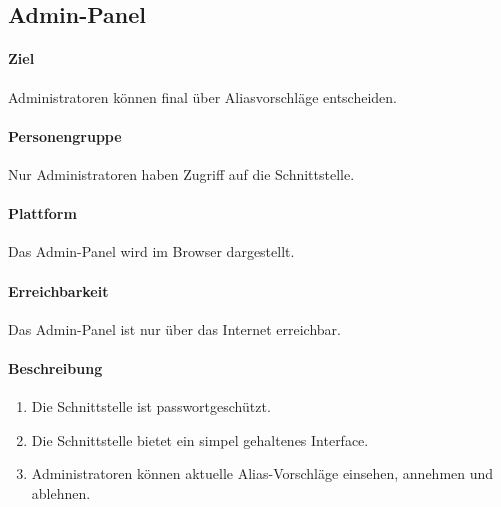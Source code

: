 \subsection{Admin-Panel}
\label{Admin-Panel}
\paragraph{Ziel}
Administratoren können final über Aliasvorschläge entscheiden.
\paragraph{Personengruppe}
Nur Administratoren haben Zugriff auf die Schnittstelle.
\paragraph{Plattform}
Das Admin-Panel wird im Browser dargestellt.
\paragraph{Erreichbarkeit}
Das Admin-Panel ist nur über das Internet erreichbar. 

\paragraph{Beschreibung}
\begin{enumerate}
    \item Die Schnittstelle ist passwortgeschützt.
    \item Die Schnittstelle bietet ein simpel gehaltenes Interface.
    \item Administratoren können aktuelle Alias-Vorschläge einsehen, annehmen und ablehnen.
\end{enumerate}